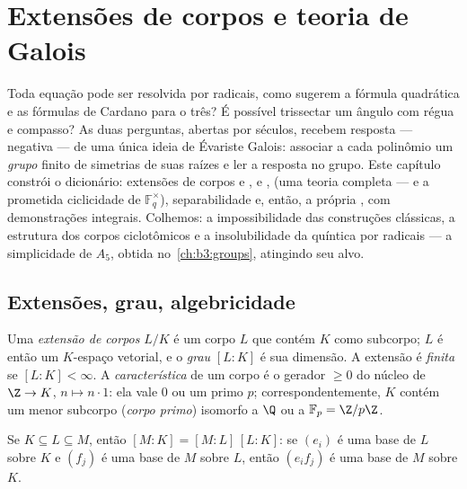 \chapter{Extensões de corpos e teoria de Galois}\label{ch:b3:galois}

Toda equação pode ser resolvida por radicais, como sugerem a fórmula
quadrática e as fórmulas de Cardano para o  três? É possível
trissectar um ângulo com régua e compasso? As duas perguntas, abertas
por séculos, recebem resposta --- negativa --- de uma única ideia de
Évariste Galois: associar a cada polinômio um \emph{grupo} finito de
simetrias de suas raízes e ler a resposta no grupo. Este capítulo
constrói o dicionário: extensões de corpos e ,  e ,  (uma teoria completa
--- e a prometida ciclicidade de $\mathbb F_q^\times$), separabilidade e, então, a
própria , com demonstrações integrais.
Colhemos: a impossibilidade das construções clássicas, a estrutura dos
corpos ciclotômicos e a insolubilidade da quíntica por radicais --- a
simplicidade de $A_5$, obtida no~\cref{ch:b3:groups}, atingindo seu alvo.

\section{Extensões, grau, algebricidade}

\begin{definition}\label{def:b3:galois:extension}
Uma \emph{extensão de corpos} $L/K$ é um
corpo $L$ que contém $K$ como subcorpo; $L$ é então um
$K$-espaço vetorial, e o \emph{grau}
$[L:K]$ é sua dimensão. A extensão é \emph{finita} se $[L:K] <
\infty$. A
\emph{característica} de um corpo é o gerador $\geq 0$ do núcleo de
$\Z \to K$, $n \mapsto n\cdot 1$: ela vale $0$ ou um primo $p$; correspondentemente,
$K$ contém um menor subcorpo (\emph{corpo primo}) isomorfo a $\Q$
ou a $\mathbb
F_p = \Z/p\Z$.
\end{definition}

\begin{theorem}\label{thm:b3:galois:tower}
Se $K \subseteq L \subseteq M$, então $[M:K] = [M:L]\,[L:K]$: se $(e_i)$ é uma base de $L$ sobre $K$ e
$(f_j)$ é uma base de $M$ sobre $L$, então $(e_if_j)$ é uma base de
$M$ sobre $K$.
\end{theorem}


